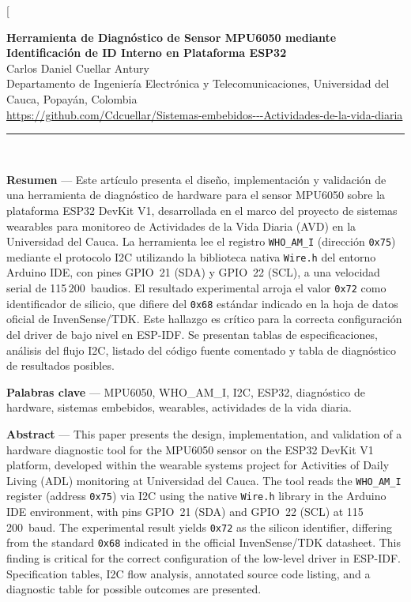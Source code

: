 \documentclass[10pt,twocolumn,a4paper]{article}
\begin{document}
\twocolumn[{%
\begin{center}
  {\large\bfseries Herramienta de Diagnóstico de Sensor MPU6050 mediante\\[2pt]
  Identificación de ID Interno en Plataforma ESP32}\\[6pt]
  {\normalsize Carlos Daniel Cuellar Antury}\\[2pt]
  {\small Departamento de Ingeniería Electrónica y Telecomunicaciones,
  Universidad del Cauca, Popayán, Colombia}\\[2pt]
  {\footnotesize\url{https://github.com/Cdcuellar/Sistemas-embebidos---Actividades-de-la-vida-diaria}}\\[6pt]
  \rule{\linewidth}{0.5pt}\\[4pt]
\end{center}
\begin{small}
\noindent\textbf{Resumen} — Este artículo presenta el diseño, implementación y
validación de una herramienta de diagnóstico de hardware para el sensor MPU6050
sobre la plataforma ESP32 DevKit V1, desarrollada en el marco del proyecto de
sistemas wearables para monitoreo de Actividades de la Vida Diaria (AVD) en la
Universidad del Cauca. La herramienta lee el registro \texttt{WHO\_AM\_I}
(dirección \texttt{0x75}) mediante el protocolo I2C utilizando la biblioteca
nativa \texttt{Wire.h} del entorno Arduino IDE, con pines GPIO~21 (SDA) y
GPIO~22 (SCL), a una velocidad serial de 115\,200~baudios. El resultado
experimental arroja el valor \texttt{0x72} como identificador de silicio, que
difiere del \texttt{0x68} estándar indicado en la hoja de datos oficial de
InvenSense/TDK. Este hallazgo es crítico para la correcta configuración del
driver de bajo nivel en ESP-IDF. Se presentan tablas de especificaciones,
análisis del flujo I2C, listado del código fuente comentado y tabla de
diagnóstico de resultados posibles.

\smallskip
\noindent\textbf{Palabras clave} — MPU6050, WHO\_AM\_I, I2C, ESP32, diagnóstico
de hardware, sistemas embebidos, wearables, actividades de la vida diaria.

\smallskip
\noindent\textbf{Abstract} — This paper presents the design, implementation, and
validation of a hardware diagnostic tool for the MPU6050 sensor on the ESP32
DevKit V1 platform, developed within the wearable systems project for Activities
of Daily Living (ADL) monitoring at Universidad del Cauca. The tool reads the
\texttt{WHO\_AM\_I} register (address \texttt{0x75}) via I2C using the native
\texttt{Wire.h} library in the Arduino IDE environment, with pins GPIO~21 (SDA)
and GPIO~22 (SCL) at 115\,200~baud. The experimental result yields \texttt{0x72}
as the silicon identifier, differing from the standard \texttt{0x68} indicated
in the official InvenSense/TDK datasheet. This finding is critical for the
correct configuration of the low-level driver in ESP-IDF. Specification tables,
I2C flow analysis, annotated source code listing, and a diagnostic table for
possible outcomes are presented.


\end{small}}
\end{document}
